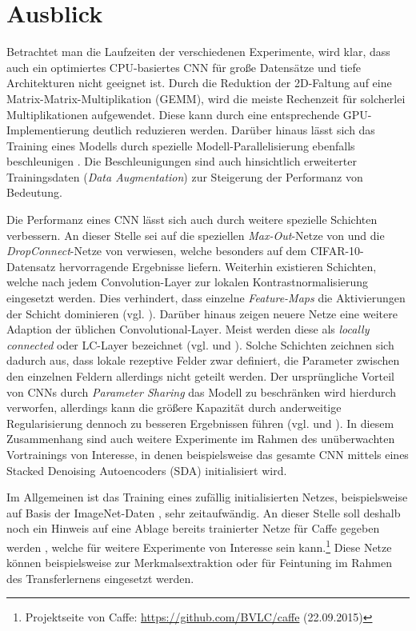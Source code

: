 \section{Ausblick}
Betrachtet man die Laufzeiten der verschiedenen Experimente, wird klar, dass auch ein optimiertes CPU-basiertes CNN für große Datensätze und tiefe Architekturen nicht geeignet ist. Durch die Reduktion der 2D-Faltung auf eine Matrix-Matrix-Multiplikation (GEMM), wird die meiste Rechenzeit für solcherlei Multiplikationen aufgewendet. Diese kann durch eine entsprechende GPU-Implementierung deutlich reduzieren werden. Darüber hinaus lässt sich das Training eines Modells durch spezielle Modell-Parallelisierung ebenfalls beschleunigen \cite[vgl.][]{Krizhevsky2014}. Die Beschleunigungen sind auch hinsichtlich erweiterter Trainingsdaten (\textit{Data Augmentation}) zur Steigerung der Performanz von Bedeutung.

Die Performanz eines CNN lässt sich auch durch weitere spezielle Schichten verbessern. An dieser Stelle sei auf die speziellen \textit{Max-Out}-Netze von \cite{Goodfellow_maxout_2013} und die \textit{DropConnect}-Netze von \cite{Zeiler2013} verwiesen, welche besonders auf dem CIFAR-10-Datensatz hervorragende Ergebnisse liefern.
Weiterhin existieren Schichten, welche nach jedem Convolution-Layer zur lokalen Kontrastnormalisierung eingesetzt werden. Dies verhindert, dass einzelne \textit{Feature-Maps} die Aktivierungen der Schicht dominieren (vgl. \cite{Jarrett2009}).
Darüber hinaus zeigen neuere Netze eine weitere Adaption der üblichen Convolutional-Layer. Meist werden diese als \textit{locally connected} oder LC-Layer bezeichnet (vgl. \cite{Nouri2013} und \cite{LeRanzato2012}). Solche Schichten zeichnen sich dadurch aus, dass lokale rezeptive Felder zwar definiert, die Parameter zwischen den einzelnen Feldern allerdings nicht geteilt werden. Der ursprüngliche Vorteil von CNNs durch \textit{Parameter Sharing} das Modell zu beschränken wird hierdurch verworfen, allerdings kann die größere Kapazität durch anderweitige Regularisierung dennoch zu besseren Ergebnissen führen (vgl. \cite{Hinton2012} und \cite{Krizhevsky2012}).
In diesem Zusammenhang sind auch weitere Experimente im Rahmen des unüberwachten Vortrainings von Interesse, in denen beispielsweise das gesamte CNN mittels eines Stacked Denoising Autoencoders (SDA) initialisiert wird.

Im Allgemeinen ist das Training eines zufällig initialisierten Netzes, beispielsweise auf Basis der ImageNet-Daten \cite[vgl.][]{ImageNet2015}, sehr zeitaufwändig. An dieser Stelle soll deshalb noch ein Hinweis auf eine Ablage bereits trainierter Netze für Caffe gegeben werden \cite[vgl.][]{Caffe2014}, welche für weitere Experimente von Interesse sein kann.\footnote{Projektseite von Caffe: \url{https://github.com/BVLC/caffe} (22.09.2015)}  Diese Netze können beispielsweise zur Merkmalsextraktion oder für Feintuning im Rahmen des Transferlernens eingesetzt werden.

